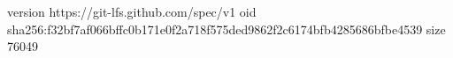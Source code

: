 version https://git-lfs.github.com/spec/v1
oid sha256:f32bf7af066bffc0b171e0f2a718f575ded9862f2c6174bfb4285686bfbe4539
size 76049
